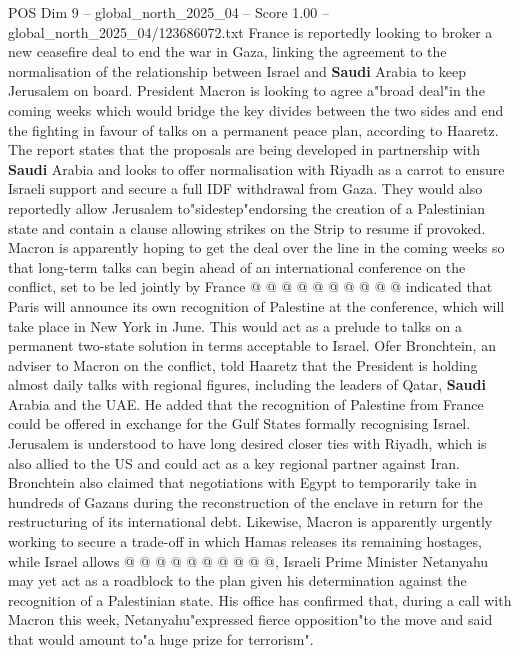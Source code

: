 \begin{textsample}{POS Dim 9 – global\_north\_2025\_04 – Score 1.00 – global\_north\_2025\_04/123686072.txt}  \label{ex:f9_pos_322}
France is reportedly looking to broker a new ceasefire deal to end the war in Gaza, linking the agreement to the normalisation of the relationship between Israel and \textbf{Saudi} Arabia to keep Jerusalem on board.
President Macron is looking to agree a"broad deal"in the coming weeks which would bridge the key divides between the two sides and end the fighting in favour of talks on a permanent peace plan, according to Haaretz.
The report states that the proposals are being developed in partnership with \textbf{Saudi} Arabia and looks to offer normalisation with Riyadh as a carrot to ensure Israeli support and secure a full IDF withdrawal from Gaza.
They would also reportedly allow Jerusalem to"sidestep"endorsing the creation of a Palestinian state and contain a clause allowing strikes on the Strip to resume if provoked.
Macron is apparently hoping to get the deal over the line in the coming weeks so that long-term talks can begin ahead of an international conference on the conflict, set to be led jointly by France @ @ @ @ @ @ @ @ @ @ indicated that Paris will announce its own recognition of Palestine at the conference, which will take place in New York in June.
This would act as a prelude to talks on a permanent two-state solution in terms acceptable to Israel.
Ofer Bronchtein, an adviser to Macron on the conflict, told Haaretz that the President is holding almost daily talks with regional figures, including the leaders of Qatar, \textbf{Saudi} Arabia and the UAE.
He added that the recognition of Palestine from France could be offered in exchange for the Gulf States formally recognising Israel.
Jerusalem is understood to have long desired closer ties with Riyadh, which is also allied to the US and could act as a key regional partner against Iran.
Bronchtein also claimed that negotiations with Egypt to temporarily take in hundreds of Gazans during the reconstruction of the enclave in return for the restructuring of its international debt.
Likewise, Macron is apparently urgently working to secure a trade-off in which Hamas releases its remaining hostages, while Israel allows @ @ @ @ @ @ @ @ @ @, Israeli Prime Minister Netanyahu may yet act as a roadblock to the plan given his determination against the recognition of a Palestinian state.
His office has confirmed that, during a call with Macron this week, Netanyahu"expressed fierce opposition"to the move and said that would amount to"a huge prize for terrorism".

\end{textsample}
